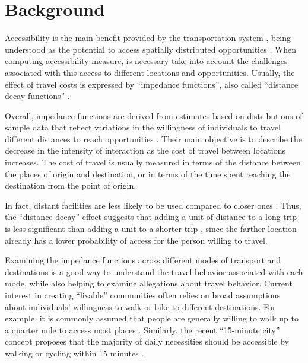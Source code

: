 \documentclass[preprint, 3p,
authoryear]{elsarticle} %
\begin{document}
\section{Background}\label{background}

Accessibility is the main benefit provided by the transportation system
\citep{pereira2017}, being understood as the potential to access
spatially distributed opportunities
\citep{hansen1959accessibility, páez2012}. When computing accessibility
measure, is necessary take into account the challenges associated with
this access to different locations and opportunities. Usually, the
effect of travel costs is expressed by ``impedance functions'', also
called ``distance decay functions''
\citep{hansen1959accessibility, koenig1980indicators, fotheringham1981spatial}.

Overall, impedance functions are derived from estimates based on
distributions of sample data that reflect variations in the willingness
of individuals to travel different distances to reach opportunities
\citep{hsiao1997use, zhao2003forecasting, iacono2010, li2020approach}.
Their main objective is to describe the decrease in the intensity of
interaction as the cost of travel between locations increases. The cost
of travel is usually measured in terms of the distance between the
places of origin and destination, or in terms of the time spent reaching
the destination from the point of origin.

In fact, distant facilities are less likely to be used compared to
closer ones
\citep{hansen1959accessibility, koenig1980indicators, fotheringham1981spatial, skov2001estimation}.
Thus, the ``distance decay'' effect suggests that adding a unit of
distance to a long trip is less significant than adding a unit to a
shorter trip \citep{carrothers1956historical}, since the farther
location already has a lower probability of access for the person
willing to travel.

Examining the impedance functions across different modes of transport
and destinations is a good way to understand the travel behavior
associated with each mode, while also helping to examine allegations
about travel behavior. Current interest in creating ``livable''
communities often relies on broad assumptions about individuals'
willingness to walk or bike to different destinations. For example, it
is commonly assumed that people are generally willing to walk up to a
quarter mile to access most places \citep{untermann1984accommodating}.
Similarly, the recent ``15-minute city'' concept proposes that the
majority of daily necessities should be accessible by walking or cycling
within 15 minutes \citep{moreno2021}.
\end{document}
